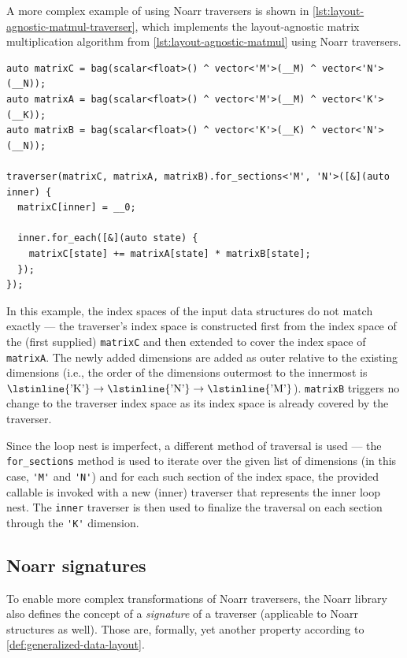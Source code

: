A more complex example of using Noarr traversers is shown in \cref{lst:layout-agnostic-matmul-traverser}, which implements the layout-agnostic matrix multiplication algorithm from \cref{lst:layout-agnostic-matmul} using Noarr traversers.

\begin{lstlisting}[style=C++, caption={A layout-agnostic matrix multiplication algorithm using Noarr traversers}, label=lst:layout-agnostic-matmul-traverser,basicstyle=\ttfamily\scriptsize]
auto matrixC = bag(scalar<float>() ^ vector<'M'>(__M) ^ vector<'N'>(__N));
auto matrixA = bag(scalar<float>() ^ vector<'M'>(__M) ^ vector<'K'>(__K));
auto matrixB = bag(scalar<float>() ^ vector<'K'>(__K) ^ vector<'N'>(__N));

traverser(matrixC, matrixA, matrixB).for_sections<'M', 'N'>([&](auto inner) {
  matrixC[inner] = __0;

  inner.for_each([&](auto state) {
    matrixC[state] += matrixA[state] * matrixB[state];
  });
});
\end{lstlisting}

In this example, the index spaces of the input data structures do not match exactly --- the traverser's index space is constructed first from the index space of the (first supplied) \lstinline{matrixC} and then extended to cover the index space of \lstinline{matrixA}. The newly added dimensions are added as outer relative to the existing dimensions (i.e., the order of the dimensions outermost to the innermost is $\text{\lstinline{'K'}} \to \text{\lstinline{'N'}} \to \text{\lstinline{'M'}}$). \lstinline{matrixB} triggers no change to the traverser index space as its index space is already covered by the traverser.

Since the loop nest is imperfect, a different method of traversal is used --- the \lstinline{for_sections} method is used to iterate over the given list of dimensions (in this case, \lstinline{'M'} and \lstinline{'N'}) and for each such section of the index space, the provided callable is invoked with a new (inner) traverser that represents the inner loop nest. The \lstinline{inner} traverser is then used to finalize the traversal on each section through the \lstinline{'K'} dimension.


\subsection{Noarr signatures}\label{sec:noarr-signatures}

To enable more complex transformations of Noarr traversers, the Noarr library also defines the concept of a \emph{signature} of a traverser (applicable to Noarr structures as well). Those are, formally, yet another property according to \cref{def:generalized-data-layout}.

